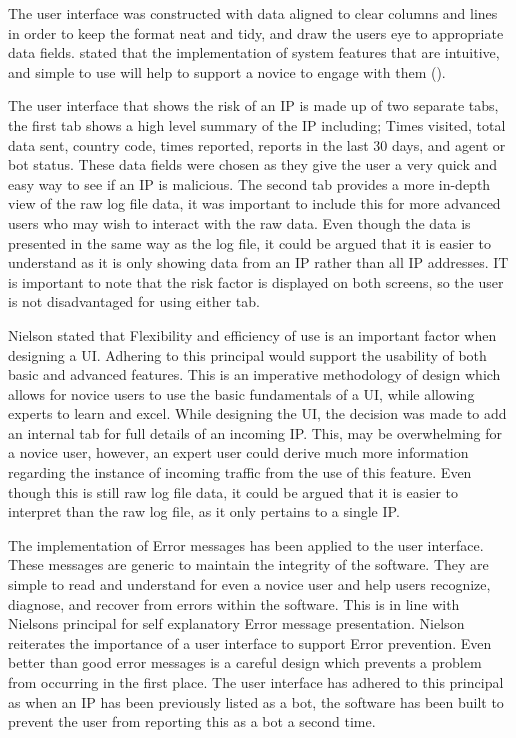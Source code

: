 The user interface was constructed with data aligned to clear columns and lines in order to keep the format neat and tidy, and draw the users eye to appropriate data fields. \citeauthor{cranor2008framework} stated that the implementation of system features that are intuitive, and simple to use will help to support a novice to engage with them (\cite{cranor2008framework}).

The user interface that shows the risk of an IP is made up of two separate tabs, the first tab shows a high level summary of the IP including; Times visited, total data sent, country code, times reported, reports in the last 30 days, and agent or bot status. These data fields were chosen as they give the user a very quick and easy way to see if an IP is malicious. The second tab provides a more in-depth view of the raw log file data, it was important to include this for more advanced users who may wish to interact with the raw data. Even though the data is presented in the same way as the log file, it could be argued that it is easier to understand as it is only showing data from an IP rather than all IP addresses. IT is important to note that the risk factor is displayed on both screens, so the user is not disadvantaged for using either tab.

Nielson stated that Flexibility and efficiency of use is an important factor when designing a UI. Adhering to this principal would support the usability of both basic and advanced features. This is an imperative methodology of design which allows for novice users to use the basic fundamentals of a UI, while allowing experts to learn and excel. While designing the UI, the decision was made to add an internal tab for full details of an incoming IP. This, may be overwhelming for a novice user, however, an expert user could derive much more information regarding the instance of incoming traffic from the use of this feature. Even though this is still raw log file data, it could be argued that it is easier to interpret than the raw log file, as it only pertains to a single IP.


The implementation of Error messages has been applied to the user interface. These messages are generic to maintain the integrity of the software. They are simple to read and understand for even a novice user and help users recognize, diagnose, and recover from errors within the software. This is in line with Nielsons principal for self explanatory Error message presentation. Nielson reiterates the importance of a user interface to support Error prevention. Even better than good error messages is a careful design which prevents a problem from occurring in the first place. The user interface has adhered to this principal as when an IP has been previously listed as a bot, the software has been built to prevent the user from reporting this as a bot a second time.

